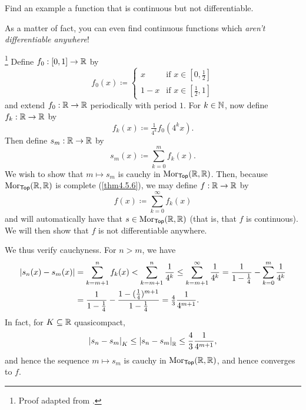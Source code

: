 \begin{exr}
Find an example a function that is continuous but not differentiable.
\end{exr}
As a matter of fact, you can even find continuous functions which \emph{aren't differentiable anywhere}!
\begin{exm}\footnote{Proof adapted from \cite{Coleman}.}\label{exm6.3.4}
Define $f_0:[0,1]\rightarrow \mathbb{R}$ by
\begin{equation}
f_0(x)\coloneqq \begin{cases}x & \text{if }x\in [0,\tfrac{1}{2}] \\ 1-x & \text{if }x\in [\tfrac{1}{2},1]\end{cases}
\end{equation}
and extend $f_0:\mathbb{R} \rightarrow \mathbb{R}$ periodically with period $1$.  For $k\in \mathbb{N}$, now define $f_k:\mathbb{R} \rightarrow \mathbb{R}$ by
\begin{equation}
f_k(x)\coloneqq \tfrac{1}{4^k}f_0(4^kx).
\end{equation}
Then define $s_m:\mathbb{R} \rightarrow \mathbb{R}$ by
\begin{equation}
s_m(x)\coloneqq \sum _{k=0}^mf_k(x).
\end{equation}
We wish to show that $m\mapsto s_m$ is cauchy in $\operatorname{Mor} _{\mathsf{Top}}(\mathbb{R},\mathbb{R} )$.    Then, because $\operatorname{Mor} _{\mathsf{Top}}(\mathbb{R} ,\mathbb{R} )$ is complete (\cref{thm4.5.6}), we may define $f:\mathbb{R} \rightarrow \mathbb{R}$ by
\begin{equation}
f(x)\coloneqq \sum _{k=0}^\infty f_k(x)
\end{equation}
and will automatically have that $s\in \operatorname{Mor} _{\mathsf{Top}}(\mathbb{R} ,\mathbb{R} )$ (that is, that $f$ is continuous).  We will then show that $f$ is not differentiable anywhere.

We thus verify cauchyness.  For $n>m$, we have
\begin{equation}
\begin{split}
\lvert s_n(x)-s_m(x)\rvert & =\sum _{k=m+1}^nf_k(x)<\sum _{k=m+1}^n\frac{1}{4^k}\leq \sum _{k=m+1}^\infty \frac{1}{4^k}=\frac{1}{1-\tfrac{1}{4}}-\sum _{k=0}^m\frac{1}{4^k} \\
& =\frac{1}{1-\tfrac{1}{4}}-\frac{1-(\tfrac{1}{4})^{m+1}}{1-\tfrac{1}{4}}=\tfrac{4}{3}\frac{1}{4^{m+1}}.
\end{split}
\end{equation}
In fact, for $K\subseteq \mathbb{R}$ quasicompact,
\begin{equation}
\norm[s_n-s_m]_K\leq \norm[s_n-s_m]_{\R}\leq \frac{4}{3}\frac{1}{4^{m+1}},
\end{equation}
and hence the sequence $m\mapsto s_m$ is cauchy in $\operatorname{Mor} _{\mathsf{Top}}(\mathbb{R} ,\mathbb{R} )$, and hence converges to $f$.


\end{exm}
